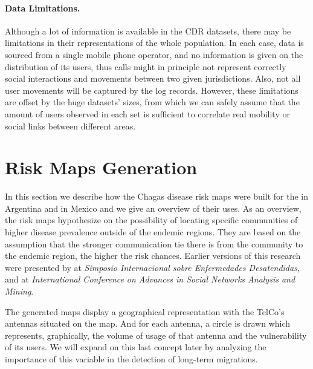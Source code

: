 

\paragraph{Data Limitations.}
Although a lot of information is available in the CDR datasets, there may be limitations in their representations of the whole population.
In each case, data is sourced from a single mobile phone operator, and no information is given on the distribution of its users, thus calls might in principle not represent correctly social interactions and movements between two given jurisdictions.
Also, not all user movements will be captured by the log records.
However, these limitations are offset by the huge datasets' sizes, from which we can safely assume that the amount of users observed in each set is sufficient to correlate real mobility or social links between different areas.


\section{ Risk Maps Generation}\label{section:risk_maps}

In this section we describe how the Chagas disease risk maps were built for the in Argentina and in Mexico and we give an overview of their uses.
As an overview, the risk maps hypothesize on the possibility of locating specific communities of higher disease prevalence outside of the endemic regions.
They are based on the assumption that the stronger communication tie there is from the community to the endemic region, the higher the risk chances.
Earlier versions of this research were presented by \cite{sarraute2015descubriendo}
at \emph{Simposio Internacional sobre Enfermedades Desatendidas},
and\cite{deMonasterio2016analyzing} at \emph{International Conference on Advances in Social Networks Analysis and Mining}.

The generated maps display a geographical representation with the TelCo's antennas situated on the map.
And for each antenna, a circle is drawn which represents, graphically, the volume of usage of that antenna and the vulnerability of its users.
We will expand on this last concept later by analyzing the importance of this variable in the detection of long-term migrations.


